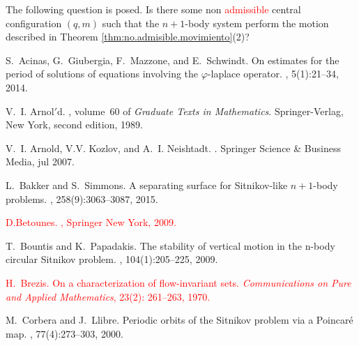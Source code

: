 \documentclass[smallcondensed]{svjour3}
\begin{document}
\begin{remark}
 The following question is posed. Is there some non \textcolor{red}{admissible} central configuration $(q,m)$ such that the $n+1$-body system perform the motion described in Theorem \ref{thm:no.admisible.movimiento}(2)?
\end{remark}




\def\cprime{$'$}
\begin{thebibliography}{10}

S.~Acinas, G.~Giubergia, F.~Mazzone, and E.~Schwindt.
\newblock On estimates for the period of solutions of equations involving the
  $\varphi$-laplace operator.
,
  5(1):21--34, 2014.

V.~I. Arnol{\cprime}d.
, volume~60 of {\em
  Graduate Texts in Mathematics}.
\newblock Springer-Verlag, New York, second edition, 1989.

V.~I. Arnold, V.V. Kozlov, and A.~I. Neishtadt.
.
\newblock Springer Science \& Business Media, jul 2007.

L.~Bakker and S.~Simmons.
\newblock A separating surface for {S}itnikov-like $n+ 1$-body problems.
, 258(9):3063--3087, 2015.

\textcolor{red}{
D.Betounes.
,
\newblock Springer New York, 2009.
}



T.~Bountis and K.~Papadakis.
\newblock The stability of vertical motion in the n-body circular {S}itnikov
  problem.
, 104(1):205--225,
  2009.

\textcolor{red}{
 H.~Brezis.
\newblock On a characterization of flow-invariant sets.
\newblock
{\em Communications on Pure and Applied Mathematics}, 23(2): 261--263, 1970.
}


M.~Corbera and J.~Llibre.
\newblock Periodic orbits of the {S}itnikov problem via a Poincar{\'e} map.
, 77(4):273--303,
  2000.


\end{thebibliography}
\end{document}
